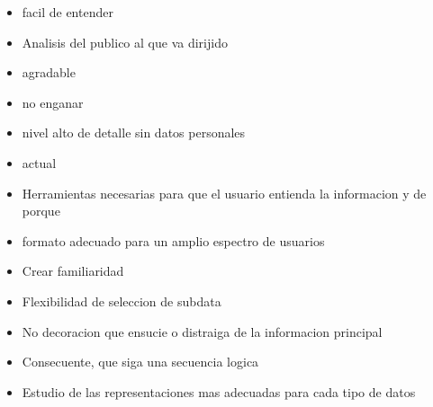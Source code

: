 \begin{itemize}
\item facil de entender
\item Analisis del publico al que va dirijido
\item agradable
\item no enganar
\item nivel alto de detalle sin datos personales
\item actual
\item Herramientas necesarias para que el usuario entienda la informacion y de porque
\item formato adecuado para un amplio espectro de usuarios
\item Crear familiaridad
\item Flexibilidad de seleccion de subdata
\item No decoracion que ensucie o distraiga de la informacion principal
\item Consecuente, que siga una secuencia logica
\item Estudio de las representaciones mas adecuadas para cada tipo de datos
  \end{itemize}